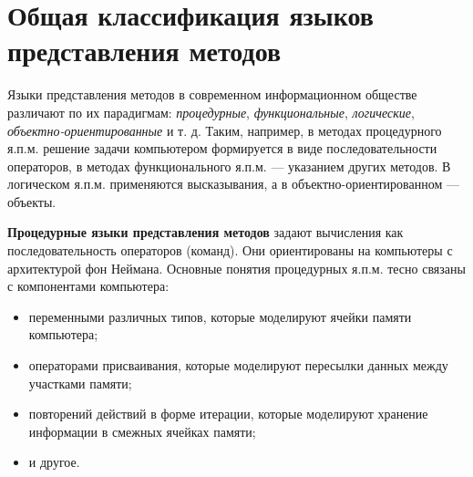 \section{Общая классификация языков представления методов}

Языки представления методов в современном информационном обществе различают по их парадигмам: \textit{процедурные}, \textit{функциональные}, \textit{логические}, \textit{объектно-ориентированные} и т. д. Таким, например, в методах процедурного я.п.м. решение задачи компьютером формируется в виде последовательности операторов, в методах функционального я.п.м. — указанием других методов. В логическом я.п.м. применяются высказывания, а в объектно-ориентированном — объекты.

\begin{SCn}
\begin{scnindent}
\end{scnindent}
\begin{scnindent}
\end{scnindent}
\begin{scnindent}
    \begin{scneqtoset}
    \end{scneqtoset}
\end{scnindent}
\end{SCn}

\textbf{Процедурные языки представления методов} задают вычисления как последовательность операторов (команд).
Они ориентированы на компьютеры с архитектурой фон Неймана. Основные понятия процедурных я.п.м. тесно связаны с компонентами компьютера:
\begin{itemize}
    \item переменными различных типов, которые моделируют ячейки памяти компьютера;
    \item операторами присваивания, которые моделируют пересылки данных между участками памяти;
    \item повторений действий в форме итерации, которые моделируют хранение информации в смежных ячейках памяти;
    \item и другое.
\end{itemize}

